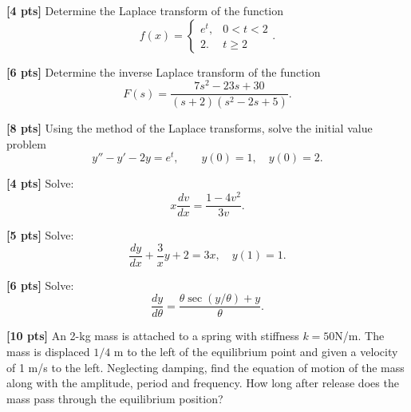 \documentclass[11pt]{article}
\begin{document}
\begin{problem}
\textbf{[4 pts]} Determine the Laplace transform of the function
\begin{equation*}
f(x) = \left\{\begin{array}{ll}e^{t}, & 0<t<2 \\2. & t\geq 2 \end{array}\right. .
\end{equation*}
\end{problem}



\begin{problem}
\textbf{[6 pts]} Determine the inverse Laplace transform of the function
\begin{equation*}
F(s) = \frac{7s^{2}-23s+30}{(s+2)(s^{2}-2s+5)}.
\end{equation*}
\end{problem}



\begin{problem}
\textbf{[8 pts]} Using the method of the Laplace transforms, solve the initial value problem 
\begin{equation*}
 y'' − y' − 2y = e ^{t} , \qquad y(0) = 1, \quad y (0) = 2 .
\end{equation*} 
\end{problem}



\begin{problem}
\textbf{[4 pts]} Solve:
\begin{equation*}
 x \frac{dv}{dx} = \frac{1-4v^{2}}{3v}.
\end{equation*}
\end{problem}


\begin{problem}
\textbf{[5 pts]} Solve:
\begin{equation*}
 \frac{dy}{dx} + \frac{3}{x} y + 2 =3x, \quad y(1)=1.
\end{equation*}
\end{problem}


\begin{problem}
\textbf{[6 pts]} Solve:
\begin{equation*}
 \frac{dy}{d\theta} = \frac{\theta\sec(y/\theta)+y}{\theta}.
\end{equation*}
\end{problem}



\begin{problem}
\textbf{[10 pts]} An 2-kg mass is attached to a spring with stiffness $k = 50$N/m. The mass is displaced $1/4$ m to the left of the equilibrium point and given a velocity of 1 m/s to the left. Neglecting damping, find the equation of motion of the mass along with the amplitude, period and frequency. How long after release does the mass pass through the equilibrium position?
\end{problem}
\end{document}
